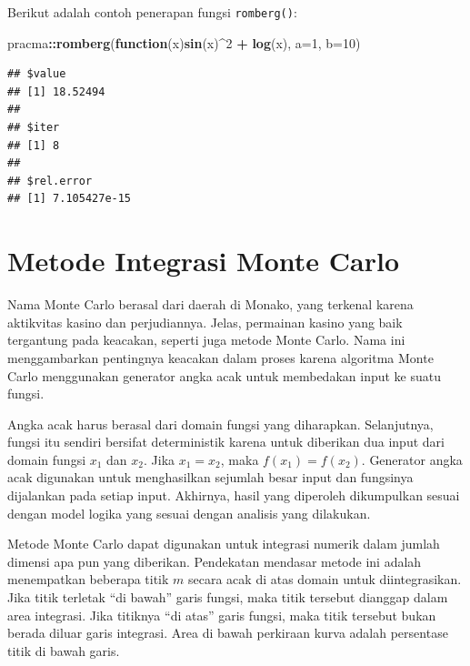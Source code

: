 \documentclass[]{book}
\newenvironment{Shaded}{\begin{snugshade}}{\end{snugshade}}
\newcommand{\ControlFlowTok}[1]{\textcolor[rgb]{0.13,0.29,0.53}{\textbf{#1}}}
\newcommand{\DataTypeTok}[1]{\textcolor[rgb]{0.13,0.29,0.53}{#1}}
\newcommand{\DecValTok}[1]{\textcolor[rgb]{0.00,0.00,0.81}{#1}}
\newcommand{\KeywordTok}[1]{\textcolor[rgb]{0.13,0.29,0.53}{\textbf{#1}}}
\newcommand{\NormalTok}[1]{#1}
\newcommand{\OperatorTok}[1]{\textcolor[rgb]{0.81,0.36,0.00}{\textbf{#1}}}
\newcommand{\StringTok}[1]{\textcolor[rgb]{0.31,0.60,0.02}{#1}}
\theoremstyle{definition}
\theoremstyle{definition}
\theoremstyle{definition}
\theoremstyle{remark}
\begin{document}
Berikut adalah contoh penerapan fungsi \texttt{romberg()}:

\begin{Shaded}
\begin{Highlighting}[]
\NormalTok{pracma}\OperatorTok{::}\KeywordTok{romberg}\NormalTok{(}\ControlFlowTok{function}\NormalTok{(x)}\KeywordTok{sin}\NormalTok{(x)}\OperatorTok{^}\DecValTok{2} \OperatorTok{+}\StringTok{ }\KeywordTok{log}\NormalTok{(x),}
        \DataTypeTok{a=}\DecValTok{1}\NormalTok{, }\DataTypeTok{b=}\DecValTok{10}\NormalTok{)}
\end{Highlighting}
\end{Shaded}

\begin{verbatim}
## $value
## [1] 18.52494
## 
## $iter
## [1] 8
## 
## $rel.error
## [1] 7.105427e-15
\end{verbatim}

\hypertarget{montecarlo}{%
\section{Metode Integrasi Monte Carlo}\label{montecarlo}}

Nama Monte Carlo berasal dari daerah di Monako, yang terkenal karena aktikvitas kasino dan perjudiannya. Jelas, permainan kasino yang baik tergantung pada keacakan, seperti juga metode Monte Carlo. Nama ini menggambarkan pentingnya keacakan dalam proses karena algoritma Monte Carlo menggunakan generator angka acak untuk membedakan input ke suatu fungsi.

Angka acak harus berasal dari domain fungsi yang diharapkan. Selanjutnya, fungsi itu sendiri bersifat deterministik karena untuk diberikan dua input dari domain fungsi \(x_1\) dan \(x_2\). Jika \(x_1 = x_2\), maka \(f \left(x_1\right) = f \left(x_2\right)\). Generator angka acak digunakan untuk menghasilkan sejumlah besar input dan fungsinya dijalankan pada setiap input. Akhirnya, hasil yang diperoleh dikumpulkan sesuai dengan model logika yang sesuai dengan analisis yang dilakukan.

Metode Monte Carlo dapat digunakan untuk integrasi numerik dalam jumlah dimensi apa pun yang diberikan. Pendekatan mendasar metode ini adalah menempatkan beberapa titik \(m\) secara acak di atas domain untuk diintegrasikan. Jika titik terletak ``di bawah'' garis fungsi, maka titik tersebut dianggap dalam area integrasi. Jika titiknya ``di atas'' garis fungsi, maka titik tersebut bukan berada diluar garis integrasi. Area di bawah perkiraan kurva adalah persentase titik di bawah garis.
\end{document}

